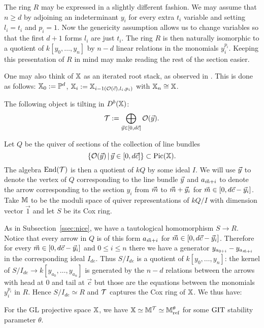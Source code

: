 \documentclass[12pt]{amsart}
\begin{document}
The ring $R$ may be expressed in a slightly different fashion. 
We may assume that $n\geq d$ by adjoining an indeterminant $y_i$ for every extra $t_i$ variable and setting $l_i= t_i$ and $p_i=1$. 
Now the genericity assumption allows us to change variables so that the first $d+1$ forms $l_i$ are just $t_i$.
The ring $R$ is then naturally isomorphic to a quotient of $k[y_0, \ldots, y_n]$ by $n-d$ linear relations in the monomials $y_i^{p_i}$.
Keeping this presentation of $R$ in mind may make reading the rest of the section easier.

One may also think of $\mathbb{X}$ as an iterated root stack, as observed in \cite[Observation 3.1.4]{HIMO}. This is done as follows: $\mathbb{X}_0:= \mathbb{P}^d$, $\mathbb{X}_i := \mathbb{X}_{i-1 (\mathcal{O}({\vec{c}}),l_i,p_i)}$ with $\mathbb{X}_n \cong \mathbb{X}$.

\begin{theorem}\cite[Theorem 6.1.2]{HIMO}
The following object is tilting in $D^b(\mathbb{X})$: $$\mathcal{T}:= \bigoplus_{{\vec{y}} \in [0,d{\vec{c}}]} \mathcal{O}({\vec{y}}).$$
\end{theorem}

Let $Q$ be the quiver of sections of the collection of line bundles $$\{\mathcal{O}({\vec{y}})\,|\,{\vec{y}} \in [0,d{\vec{c}}]\}\subset \operatorname{Pic}(\mathbb{X}).$$
The algebra $\operatorname{End}(\mathcal{T})$ is then a quotient of $kQ$ by some ideal $I$.
We will use ${\vec{y}}$ to denote the vertex of $Q$ corresponding to the line bundle ${\vec{y}}$ and $a_{{\vec{m}}+i}$ to denote the arrow corresponding to the section $y_i$ from ${\vec{m}}$ to ${\vec{m}}+{\vec{y}}_i$ for ${\vec{m}} \in [0, d{\vec{c}} - {\vec{y}}_i]$.
Take $\mathbb{M}$ to be the moduli space of quiver representations of $kQ/I$ with dimension vector $\vec{1}$ and let $S$ be its Cox ring.

As in Subsection~\ref{ssec:nice}, we have a tautological homomorphism $S \rightarrow R$.
Notice that every arrow in $Q$ is of this form $a_{{\vec{m}}+i}$ for ${\vec{m}} \in [0, d{\vec{c}} - {\vec{y}}_i]$.
Therefore for every ${\vec{m}} \in [0, d{\vec{c}} - {\vec{y}}_i]$ and $0\leq i\leq n$ there we have a generator $y_{a_{0+i}} - y_{a_{{\vec{m}}+i}}$ in the corresponding ideal $I_{de}$.
Thus $S/I_{de}$ is a quotient of $k[y_0,\ldots, y_n]$: the kernel of $S/I_{de} \rightarrow k[y_{a_0},\ldots, y_{a_n}]$ is generated by the $n-d$ relations between the arrows with head at $0$ and tail at $\vec{c}$ but those are the equations between the monomials $y_{i}^{p_i}$ in $R$.
Hence $S/I_{de} \simeq R$ and $\mathcal{T}$ captures the Cox ring of $\mathbb{X}$.
We thus have:

\begin{corollary} \label{cr:HIMO}
For the GL projective space $\mathbb{X}$, we have $\mathbb{X} \simeq \mathbb{M}^{\mathcal{T}} \simeq \mathbb{M}^\theta_\textup{ref}$ for some $\textup{GIT}$ stability parameter $\theta$.
\end{corollary}



\end{document}

